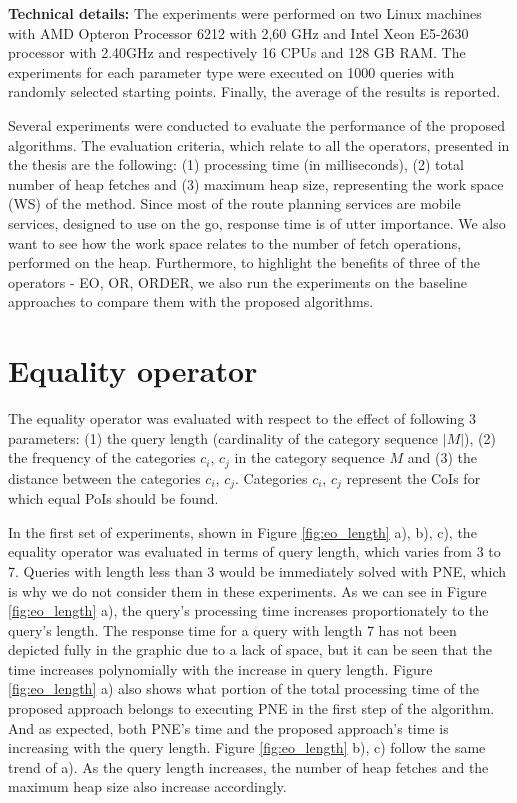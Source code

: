 \textbf{Technical details:}
The experiments were performed on two Linux machines with AMD Opteron Processor 6212 with 2,60 GHz and Intel Xeon E5-2630 processor with 2.40GHz and respectively 16 CPUs and 128 GB RAM. The experiments for each parameter type were executed on 1000 queries with randomly selected starting points. Finally, the average of the results is reported.

Several experiments were conducted to evaluate the performance of the proposed algorithms. The evaluation criteria, which relate to all the operators, presented in the thesis are the following: (1) processing time (in milliseconds), (2) total number of heap fetches and (3) maximum heap size, representing the work space (WS) of the method. Since most of the route planning services are mobile services, designed to use on the go, response time is of utter importance. We also want to see how the work space relates to the number of fetch operations, performed on the heap. Furthermore, to highlight the benefits of three of the operators - EO, OR, ORDER, we also run the experiments on the baseline approaches to compare them with the proposed algorithms. 

\section{Equality operator}
\label{sec:experimentsEO}

The equality operator was evaluated with respect to the effect of following 3 parameters: (1) the query length (cardinality of the category sequence $|M|$), (2) the frequency of the categories $c_i$, $c_j$ in the category sequence $M$ and (3) the distance between the categories $c_i$, $c_j$. Categories $c_i$, $c_j$ represent the CoIs for which equal PoIs should be found.

In the first set of experiments, shown in Figure \ref{fig:eo_length} a), b), c), the equality operator was evaluated in terms of query length, which varies from 3 to 7. Queries with length less than 3 would be immediately solved with PNE, which is why we do not consider them in these experiments. 
As we can see in Figure \ref{fig:eo_length} a), the query's processing time increases proportionately to the query's length. The response time for a query with length 7 has not been depicted fully in the graphic due to a lack of space, but it can be seen that the time increases polynomially with the increase in query length. Figure \ref{fig:eo_length} a) also shows what portion of the total processing time of the proposed approach belongs to executing PNE in the first step of the algorithm. And as expected, both PNE's time and the proposed approach's time is increasing with the query length.
Figure \ref{fig:eo_length} b), c) follow the same trend of a). As the query length increases, the number of heap fetches and the maximum heap size also increase accordingly.


